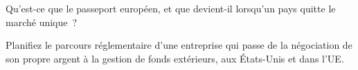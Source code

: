 \begin{interviewq}\label{iq:fm:regulators-and-licences:5}
Qu'est-ce que le passeport européen, et que devient-il lorsqu'un pays quitte le marché unique~?
\end{interviewq}

\begin{interviewq}\label{iq:fm:regulators-and-licences:6}
Planifiez le parcours réglementaire d'une entreprise qui passe de la négociation de son propre argent à la gestion de fonds extérieurs, aux États-Unis et dans l'UE.
\end{interviewq}
